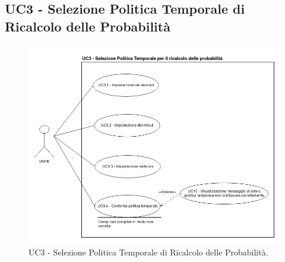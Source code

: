 \subsection{UC3 - Selezione Politica Temporale di Ricalcolo delle Probabilità}\label{UC3}
\begin{figure}[H]
\centering
\includegraphics[scale=0.5]{./images/UC3.png}
\caption{UC3 - Selezione Politica Temporale di Ricalcolo delle Probabilità.}
\end{figure}

